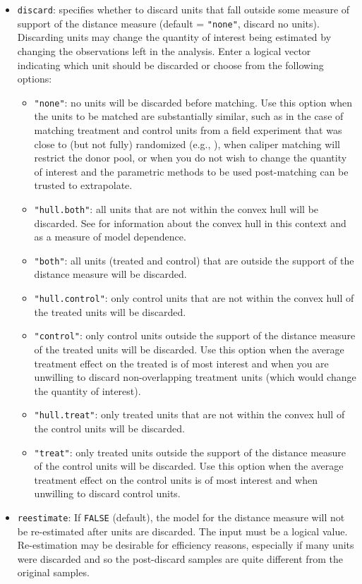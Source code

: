 \begin{itemize}
\item \texttt{discard}: specifies whether to discard units that fall
  outside some measure of support of the distance measure (default =
  \texttt{"none"}, discard no units).  Discarding units may change the
  quantity of interest being estimated by changing the observations left in the analysis. 
  Enter a logical vector
  indicating which unit should be discarded or choose from the
  following options:
  \begin{itemize}
  \item \texttt{"none"}: no units will be discarded before matching.
    Use this option when the units to be matched are substantially
    similar, such as in the case of matching treatment and control
    units from a field experiment that was close to (but not fully)
    randomized (e.g., \citealt{Imai05}), when caliper matching will
    restrict the donor pool, or when you do not wish to change the
    quantity of interest and the parametric methods to be used
    post-matching can be trusted to extrapolate.
  \item \texttt{"hull.both"}: all units that are not within the convex
    hull will be discarded.  See \citet{KinZen06,KinZen07} for
    information about the convex hull in this context and as a measure
    of model dependence.
  \item \texttt{"both"}: all units (treated and control) that are
    outside the support of the distance measure will be discarded.
  \item \texttt{"hull.control"}: only control units that are not
    within the convex hull of the treated units will be discarded.  
  \item \texttt{"control"}: only control units outside the support of
    the distance measure of the treated units will be discarded.  Use
    this option when the average treatment effect on the treated is of
    most interest and when you are unwilling to discard
    non-overlapping treatment units (which would change the quantity
    of interest).
  \item \texttt{"hull.treat"}: only treated units that are not within
    the convex hull of the control units will be discarded. 
  \item \texttt{"treat"}: only treated units outside the support of
    the distance measure of the control units will be discarded.  Use
    this option when the average treatment effect on the control units
    is of most interest and when unwilling to discard control units.
  \end{itemize}
  
\item \texttt{reestimate}: If {\tt FALSE} (default), the model for the
  distance measure will not be re-estimated after units are discarded.
  The input must be a logical value.  Re-estimation may be desirable
  for efficiency reasons, especially if many units were discarded and
  so the post-discard samples are quite different from the original
  samples.
  
\end{itemize}

